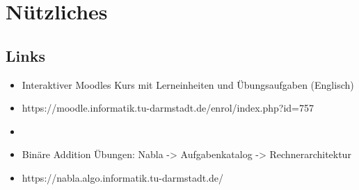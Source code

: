 



\section{Nützliches}
\subsection{Links}
\begin{itemize}
\item Interaktiver Moodles Kurs mit Lerneinheiten und Übungsaufgaben (Englisch)
\item https://moodle.informatik.tu-darmstadt.de/enrol/index.php?id=757
\item[]
\item Binäre Addition Übungen: Nabla -> Aufgabenkatalog -> Rechnerarchitektur
\item https://nabla.algo.informatik.tu-darmstadt.de/
\end{itemize}